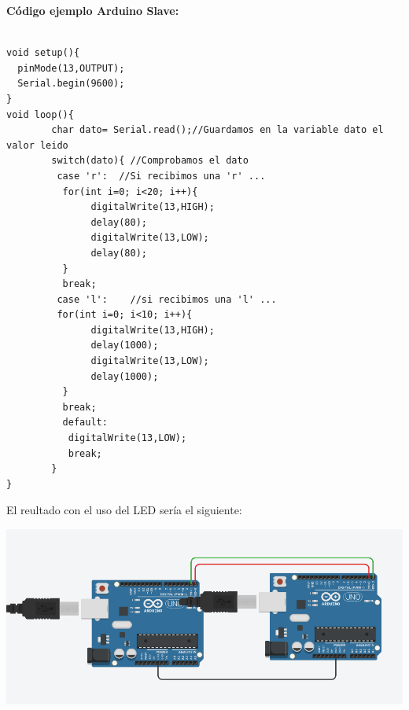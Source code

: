 \documentclass{article}
\begin{document}
\textbf{Código ejemplo Arduino Slave: }
\begin{verbatim}

void setup(){ 
  pinMode(13,OUTPUT);
  Serial.begin(9600);
}
void loop(){ 
        char dato= Serial.read();//Guardamos en la variable dato el valor leido
        switch(dato){ //Comprobamos el dato
         case 'r':  //Si recibimos una 'r' ...
          for(int i=0; i<20; i++){
               digitalWrite(13,HIGH);
               delay(80);
               digitalWrite(13,LOW);
               delay(80);
          }
          break;
         case 'l':    //si recibimos una 'l' ...
         for(int i=0; i<10; i++){
               digitalWrite(13,HIGH);
               delay(1000);
               digitalWrite(13,LOW);
               delay(1000);
          }
          break;
          default:
           digitalWrite(13,LOW);
           break;
        }
}

\end{verbatim}

El reultado con el uso del LED sería el siguiente:

\includegraphics[scale=0.4]{figura4.png}
\newpage
\end{document}
